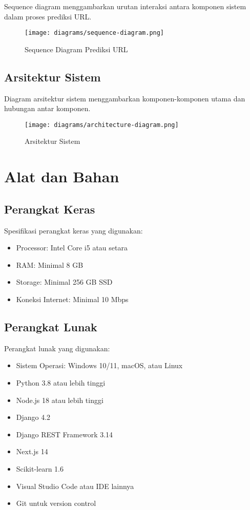 Sequence diagram menggambarkan urutan interaksi antara komponen sistem dalam proses prediksi URL.

\begin{figure}[htbp]
    \centering
    \texttt{[image: diagrams/sequence-diagram.png]}
    \caption{Sequence Diagram Prediksi URL}
    \label{fig:sequence}
\end{figure}

\clearpage

\subsection{Arsitektur Sistem}

Diagram arsitektur sistem menggambarkan komponen-komponen utama dan hubungan antar komponen.

\begin{figure}[htbp]
    \centering
    \texttt{[image: diagrams/architecture-diagram.png]}
    \caption{Arsitektur Sistem}
    \label{fig:architecture}
\end{figure}

\clearpage

\section{Alat dan Bahan}

\subsection{Perangkat Keras}

Spesifikasi perangkat keras yang digunakan:
\begin{itemize}
    \item Processor: Intel Core i5 atau setara
    \item RAM: Minimal 8 GB
    \item Storage: Minimal 256 GB SSD
    \item Koneksi Internet: Minimal 10 Mbps
\end{itemize}

\subsection{Perangkat Lunak}

Perangkat lunak yang digunakan:
\begin{itemize}
    \item Sistem Operasi: Windows 10/11, macOS, atau Linux
    \item Python 3.8 atau lebih tinggi
    \item Node.js 18 atau lebih tinggi
    \item Django 4.2
    \item Django REST Framework 3.14
    \item Next.js 14
    \item Scikit-learn 1.6
    \item Visual Studio Code atau IDE lainnya
    \item Git untuk version control
\end{itemize}

